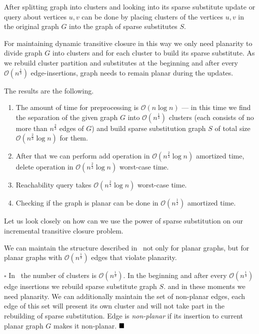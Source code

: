 After splitting graph into clusters and looking into its sparse substitute update or query about vertices $u, v$ can be done by placing clusters of the vertices $u, v$ in the original graph $G$ into the graph of sparse substitutes $S$.

For maintaining dynamic transitive closure in this way we only need planarity to divide graph $G$ into clusters and for each cluster to build its sparse substitute. As we rebuild cluster partition and substitutes at the beginning and after every $\mathcal{O}(n^{\frac{1}{3}})$ edge-insertions, graph needs to remain planar during the updates. 

The results are the following.
 
\begin{enumerate}
	\item The amount of time for preprocessing is $\mathcal{O}(n \log n)$ --- in this time we find the separation of the given graph $G$ into $\mathcal{O}(n^{\frac{1}{3}})$ clusters (each consists of no more than $n^{\frac{2}{3}}$ edges of $G$) and build sparse substitution graph $S$ of total size $\mathcal{O}(n^{\frac{2}{3}} \log n)$ for them.
	
	\item After that we can perform add operation in $\mathcal{O}(n^{\frac{2}{3}} \log n)$ amortized time, delete operation in $\mathcal{O}(n^{\frac{2}{3}} \log n)$ worst-case time.
	
	\item Reachability query takes $\mathcal{O}(n^{\frac{2}{3}} \log n)$ worst-case time.
	
	\item Checking if the graph is planar can be done in $\mathcal{O}(n^{\frac{1}{2}})$ amortized time. 
\end{enumerate}

Let us look closely on how can we use the power of sparse substitution on our incremental transitive closure problem.

\begin{proposition}
We can maintain the structure described in~\cite{10.5555/647903.739284} not only for planar graphs, but for planar graphs with $\mathcal{O}(n^{\frac{1}{3}})$ edges that violate planarity. 
\end{proposition}

$\square$
In~\cite{10.5555/647903.739284} the number of clusters is $\mathcal{O}(n^{\frac{1}{3}})$. In the beginning and after every $\mathcal{O}(n^{\frac{1}{3}})$ edge insertions we rebuild sparse substitute graph $S$. and in these moments we need planarity. We can additionally maintain the set of non-planar edges, each edge of this set will present its own cluster and will not take part in the rebuilding of sparse substitution. Edge is \textit{non-planar} if its insertion to current planar graph $G$ makes it non-planar.
$\hfill\blacksquare$

